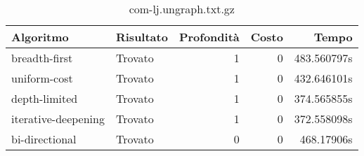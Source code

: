 \begin{table}[h]
\centering
\begin{tabular}{|l|l|r|r|r|}
\hline
\textbf{Algoritmo} & \textbf{Risultato} & \textbf{Profondità} & \textbf{Costo} & \textbf{Tempo} \\
 \hline
breadth-first & Trovato & 1 & 0 & 483.560797s \\
uniform-cost & Trovato & 1 & 0 & 432.646101s \\
depth-limited & Trovato & 1 & 0 & 374.565855s \\
iterative-deepening & Trovato & 1 & 0 & 372.558098s \\
bi-directional & Trovato & 0 & 0 & 468.17906s \\
\hline
\end{tabular}
\caption{com-lj.ungraph.txt.gz}
\end{table}
